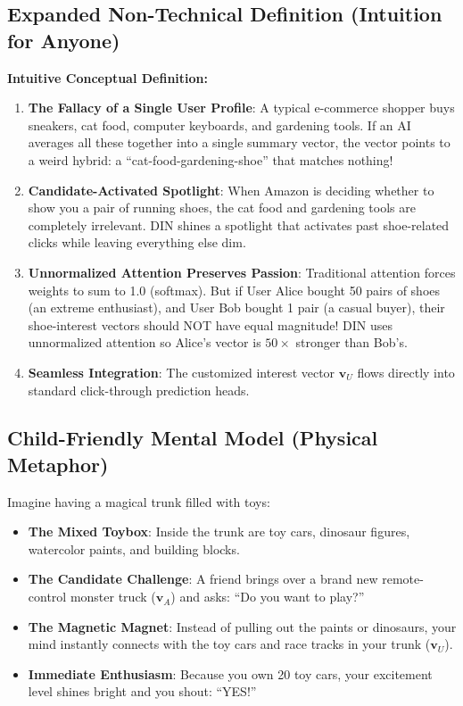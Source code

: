\documentclass[11pt,a4paper]{article}
\theoremstyle{definition}
\begin{document}
\subsection{Expanded Non-Technical Definition (Intuition for Anyone)}
\textbf{Intuitive Conceptual Definition:}
\begin{enumerate}
    \item \textbf{The Fallacy of a Single User Profile}: A typical e-commerce shopper buys sneakers, cat food, computer keyboards, and gardening tools. If an AI averages all these together into a single summary vector, the vector points to a weird hybrid: a ``cat-food-gardening-shoe'' that matches nothing!
    \item \textbf{Candidate-Activated Spotlight}: When Amazon is deciding whether to show you a pair of running shoes, the cat food and gardening tools are completely irrelevant. DIN shines a spotlight that activates past shoe-related clicks while leaving everything else dim.
    \item \textbf{Unnormalized Attention Preserves Passion}: Traditional attention forces weights to sum to 1.0 (softmax). But if User Alice bought 50 pairs of shoes (an extreme enthusiast), and User Bob bought 1 pair (a casual buyer), their shoe-interest vectors should NOT have equal magnitude! DIN uses unnormalized attention so Alice's vector is $50\times$ stronger than Bob's.
    \item \textbf{Seamless Integration}: The customized interest vector $\mathbf{v}_U$ flows directly into standard click-through prediction heads.
\end{enumerate}

\subsection{Child-Friendly Mental Model (Physical Metaphor)}
Imagine having a magical trunk filled with toys:
\begin{itemize}
    \item \textbf{The Mixed Toybox}: Inside the trunk are toy cars, dinosaur figures, watercolor paints, and building blocks.
    \item \textbf{The Candidate Challenge}: A friend brings over a brand new remote-control monster truck ($\mathbf{v}_A$) and asks: ``Do you want to play?''
    \item \textbf{The Magnetic Magnet}: Instead of pulling out the paints or dinosaurs, your mind instantly connects with the toy cars and race tracks in your trunk ($\mathbf{v}_U$).
    \item \textbf{Immediate Enthusiasm}: Because you own 20 toy cars, your excitement level shines bright and you shout: ``YES!''
\end{itemize}
\end{document}
